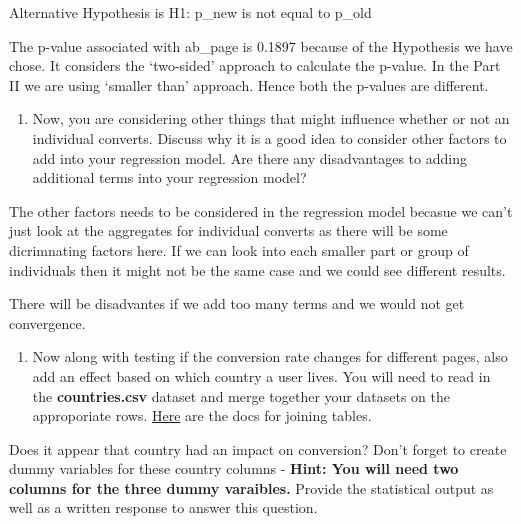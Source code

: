 \documentclass[11pt]{article}
\providecommand{\tightlist}{%
      \setlength{\itemsep}{0pt}\setlength{\parskip}{0pt}}
\begin{document}
Alternative Hypothesis is H1: p\_new is not equal to p\_old

The p-value associated with ab\_page is 0.1897 because of the Hypothesis
we have chose. It considers the `two-sided' approach to calculate the
p-value. In the Part II we are using `smaller than' approach. Hence both
the p-values are different.

    \begin{enumerate}
\def\labelenumi{\alph{enumi}.}
\setcounter{enumi}{5}
\tightlist
\item
  Now, you are considering other things that might influence whether or
  not an individual converts. Discuss why it is a good idea to consider
  other factors to add into your regression model. Are there any
  disadvantages to adding additional terms into your regression model?
\end{enumerate}

    The other factors needs to be considered in the regression model becasue
we can't just look at the aggregates for individual converts as there
will be some dicrimnating factors here. If we can look into each smaller
part or group of individuals then it might not be the same case and we
could see different results.

There will be disadvantes if we add too many terms and we would not get
convergence.

    \begin{enumerate}
\def\labelenumi{\alph{enumi}.}
\setcounter{enumi}{6}
\tightlist
\item
  Now along with testing if the conversion rate changes for different
  pages, also add an effect based on which country a user lives. You
  will need to read in the \textbf{countries.csv} dataset and merge
  together your datasets on the approporiate rows.
  \href{https://pandas.pydata.org/pandas-docs/stable/generated/pandas.DataFrame.join.html}{Here}
  are the docs for joining tables.
\end{enumerate}

Does it appear that country had an impact on conversion? Don't forget to
create dummy variables for these country columns - \textbf{Hint: You
will need two columns for the three dummy varaibles.} Provide the
statistical output as well as a written response to answer this
question.
\end{document}

